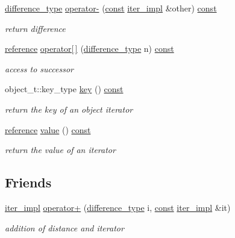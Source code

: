 \begin{DoxyCompactItemize}
\hyperlink{classnlohmann_1_1detail_1_1iter__impl_a2f7ea9f7022850809c60fc3263775840}{difference\+\_\+type} \hyperlink{classnlohmann_1_1detail_1_1iter__impl_a327f3f6a97c6d0cdfc9fe232949d916b}{operator-\/} (\hyperlink{functions__c_8js_afacfd9c985d225bb07483b887a801b6f}{const} \hyperlink{classnlohmann_1_1detail_1_1iter__impl}{iter\+\_\+impl} \&other) \hyperlink{functions__c_8js_afacfd9c985d225bb07483b887a801b6f}{const} 
\begin{DoxyCompactList}\small\item\em return difference \end{DoxyCompactList}\item 
\hyperlink{classnlohmann_1_1detail_1_1iter__impl_a5be8001be099c6b82310f4d387b953ce}{reference} \hyperlink{classnlohmann_1_1detail_1_1iter__impl_ade15572ccb7c5b9c2541ecfd65252e99}{operator\mbox{[}$\,$\mbox{]}} (\hyperlink{classnlohmann_1_1detail_1_1iter__impl_a2f7ea9f7022850809c60fc3263775840}{difference\+\_\+type} n) \hyperlink{functions__c_8js_afacfd9c985d225bb07483b887a801b6f}{const} 
\begin{DoxyCompactList}\small\item\em access to successor \end{DoxyCompactList}\item 
object\+\_\+t\+::key\+\_\+type \hyperlink{classnlohmann_1_1detail_1_1iter__impl_aa2e9909148c4df211d89a0a8608e556c}{key} () \hyperlink{functions__c_8js_afacfd9c985d225bb07483b887a801b6f}{const} 
\begin{DoxyCompactList}\small\item\em return the key of an object iterator \end{DoxyCompactList}\item 
\hyperlink{classnlohmann_1_1detail_1_1iter__impl_a5be8001be099c6b82310f4d387b953ce}{reference} \hyperlink{classnlohmann_1_1detail_1_1iter__impl_adc4048d25e057ce8ec0b912642c24731}{value} () \hyperlink{functions__c_8js_afacfd9c985d225bb07483b887a801b6f}{const} 
\begin{DoxyCompactList}\small\item\em return the value of an iterator \end{DoxyCompactList}\end{DoxyCompactItemize}
\subsection*{Friends}
\begin{DoxyCompactItemize}
\item 
\hyperlink{classnlohmann_1_1detail_1_1iter__impl}{iter\+\_\+impl} \hyperlink{classnlohmann_1_1detail_1_1iter__impl_a94108d1a7563e103534f23eb5c1ee175}{operator+} (\hyperlink{classnlohmann_1_1detail_1_1iter__impl_a2f7ea9f7022850809c60fc3263775840}{difference\+\_\+type} i, \hyperlink{functions__c_8js_afacfd9c985d225bb07483b887a801b6f}{const} \hyperlink{classnlohmann_1_1detail_1_1iter__impl}{iter\+\_\+impl} \&it)
\begin{DoxyCompactList}\small\item\em addition of distance and iterator \end{DoxyCompactList}\end{DoxyCompactItemize}


